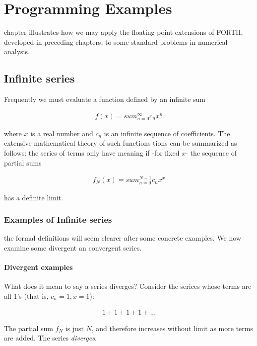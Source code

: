\chapter{Programming Examples}

 chapter illustrates how we may apply the floating point extensions of FORTH, developed in preceding chapters, to some standard problems in numerical analysis.

\section{Infinite series}

Frequently we must evaluate a function defined by an infinite sum

\begin{align}
    f(x) = sum_{n=0}^{\infty}c_{n}x^{n}
\end{align}

where $x$ is a real number and $c_n$ is an infinite sequence of coefficients. The extensive mathematical theory of such functions tions can be summarized as follows: the series of terms only have meaning if -for fixed $x$- the sequence of partial sums

\begin{align}
    f_{N}(x) = sum_{n=0}^{N-1}c_{n}x^{x}
\end{align}

has a definite limit.

\subsection{Examples of Infinite series}
 the formal definitions will seem clearer after some concrete examples. We now examine some divergent an convergent series.

\subsubsection{Divergent examples}
What does it mean to say a series diverges? Consider the serices whose terms are all 1's (that is, $c_n = 1, x = 1$):

\begin{align}
    1 + 1 + 1 + 1 + ...
\end{align}

The partial sum $f_N$ is just $N$, and therefore increases without limit as more terms are added. The series \textit{diverges}.

